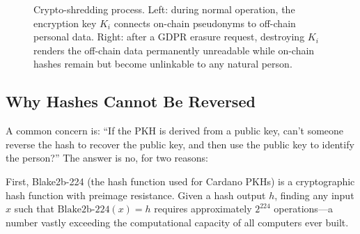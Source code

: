 \begin{figure}[H]
\caption{Crypto-shredding process.  Left: during normal operation, the
  encryption key $K_i$ connects on-chain pseudonyms to off-chain personal
  data.  Right: after a GDPR erasure request, destroying $K_i$ renders the
  off-chain data permanently unreadable while on-chain hashes remain but
  become unlinkable to any natural person.}
\label{fig:crypto-shredding}
\end{figure}

\subsection{Why Hashes Cannot Be Reversed}

A common concern is: ``If the PKH is derived from a public key, can't
someone reverse the hash to recover the public key, and then use the public
key to identify the person?''  The answer is no, for two reasons:

First, Blake2b-224 (the hash function used for Cardano PKHs) is a
cryptographic hash function with preimage resistance.  Given a hash output
$h$, finding any input $x$ such that $\text{Blake2b-224}(x) = h$ requires
approximately $2^{224}$ operations---a number vastly exceeding the
computational capacity of all computers ever built.


